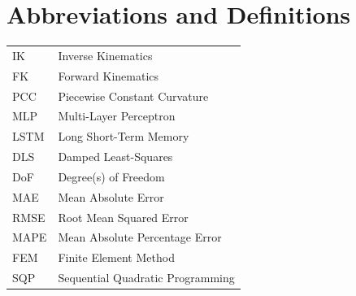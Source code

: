\chapter{Abbreviations and Definitions}
\thispagestyle{plain}

\begin{tabular}{ll}
IK       & Inverse Kinematics \\
FK       & Forward Kinematics \\
PCC      & Piecewise Constant Curvature \\
MLP      & Multi-Layer Perceptron \\
LSTM     & Long Short-Term Memory \\
DLS      & Damped Least-Squares \\
DoF      & Degree(s) of Freedom \\
MAE      & Mean Absolute Error \\
RMSE     & Root Mean Squared Error \\
MAPE     & Mean Absolute Percentage Error \\
FEM      & Finite Element Method \\
SQP      & Sequential Quadratic Programming \\
\end{tabular}
